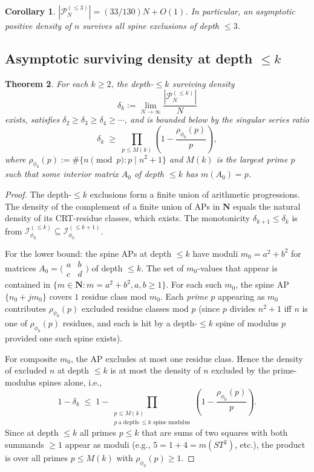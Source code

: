 \documentclass[11pt]{article}
\newtheorem{theorem}{Theorem}[section]
\newtheorem{corollary}[theorem]{Corollary}
\theoremstyle{definition}
\newcommand{\N}{\mathbf{N}}
\newcommand{\Iset}{\mathcal{I}_{\phi_0}}
\begin{document}
\begin{corollary}\label{cor:depth3-survivors}
$|\mathcal{P}^{(\le 3)}_N| = (33/130) N + O(1)$. In particular, an asymptotic positive density of $n$ survives all spine exclusions of depth $\le 3$.
\end{corollary}

\subsection{Asymptotic surviving density at depth $\le k$}

\begin{theorem}\label{thm:depth-k-upper}
For each $k \ge 2$, the depth-$\le k$ surviving density
\[
\delta_k := \lim_{N \to \infty} \frac{|\mathcal{P}^{(\le k)}_N|}{N}
\]
exists, satisfies $\delta_2 \ge \delta_3 \ge \delta_4 \ge \cdots$, and is bounded below by the singular series ratio
\begin{equation}\label{eq:singular-series-bound}
\delta_k \;\ge\; \prod_{p \le M(k)} \!\left(1 - \frac{\rho_{\phi_0}(p)}{p}\right),
\end{equation}
where $\rho_{\phi_0}(p) := \#\{n \pmod p : p \mid n^2+1\}$ and $M(k)$ is the largest prime $p$ such that some interior matrix $A_0$ of depth $\le k$ has $m(A_0) = p$.
\end{theorem}

\begin{proof}
The depth-$\le k$ exclusions form a finite union of arithmetic progressions. The density of the complement of a finite union of APs in $\N$ equals the natural density of its CRT-residue classes, which exists. The monotonicity $\delta_{k+1} \le \delta_k$ is from $\Iset^{(\le k)} \subseteq \Iset^{(\le k+1)}$.

For the lower bound: the spine APs at depth $\le k$ have moduli $m_0 = a^2+b^2$ for matrices $A_0 = \bigl(\begin{smallmatrix}a&b\\c&d\end{smallmatrix}\bigr)$ of depth $\le k$. The set of $m_0$-values that appear is contained in $\{m \in \N : m = a^2+b^2, a,b \ge 1\}$. For each such $m_0$, the spine AP $\{n_0+jm_0\}$ covers $1$ residue class mod $m_0$. Each \emph{prime} $p$ appearing as $m_0$ contributes $\rho_{\phi_0}(p)$ excluded residue classes mod $p$ (since $p$ divides $n^2+1$ iff $n$ is one of $\rho_{\phi_0}(p)$ residues, and each is hit by a depth-$\le k$ spine of modulus $p$ provided one such spine exists).

For composite $m_0$, the AP excludes at most one residue class. Hence the density of excluded $n$ at depth $\le k$ is at most the density of $n$ excluded by the prime-modulus spines alone, i.e.,
\[
1 - \delta_k \;\le\; 1 - \prod_{\substack{p \le M(k) \\ p\ \text{a depth-$\le k$ spine modulus}}} \!\!\left(1 - \frac{\rho_{\phi_0}(p)}{p}\right).
\]
Since at depth $\le k$ all primes $p \le k$ that are sums of two squares with both summands $\ge 1$ appear as moduli (e.g., $5 = 1+4 = m(ST^2)$, etc.), the product is over all primes $p \le M(k)$ with $\rho_{\phi_0}(p) \ge 1$.
\end{proof}
\end{document}
